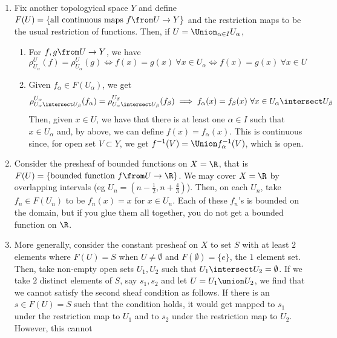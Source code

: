 \documentclass[11pt,leqno,oneside]{amsbook}
\renewcommand{\F}{F}
\numberwithin{thm}{section}
\begin{document}
\begin{example}
  \begin{enumerate}[label=(\arabic*)]
  \item Fix another topologyical space \(Y\) and define \(\F(U) =
    \{\text{all continuous maps }f \from U \to Y\}\) and the
    restriction maps to be the usual restriction of functions. Then,
    if \(U = \Union_{\alpha \in I} U_\alpha\),
    \begin{enumerate}
    \item For \(f,g \from U \to Y\), we have \[
        \rho^U_{U_\alpha}(f) = \rho^U_{U_\alpha}(g) \iff f(x) = g(x)\ 
        \forall x \in U_\alpha \iff f(x) = g(x)\ \forall x \in U
      \]
    \item Given \(f_\alpha \in \F(U_\alpha)\), we get \[
        \rho^{U_\alpha}_{U_\alpha \intersect U_\beta}(f_\alpha) =
        \rho^{U_\beta}_{U_\alpha \intersect U_\beta}(f_\beta) \implies
        f_\alpha(x) = f_\beta(x) \ \forall x \in U_\alpha \intersect U_\beta
      \]
      Then, given \(x \in U\), we have that there is at least one
      \(\alpha \in I\) such that \(x \in U_\alpha\) and, by above, we
      can define \(f(x) = f_\alpha(x)\). This is continuous since, for
      open set \(V \subset Y\), we get \(f^{-1}(V) = \Union
      f_\alpha^{-1}(V)\), which is open. 
    \end{enumerate}
  \item Consider the presheaf of bounded functions on \(X=\R\), that
    is \(\F(U) = \{\text{bounded function }f \from U \to \R\}\). We
    may cover \(X = \R\) by overlapping intervals (eg \(U_n =
    (n-\frac{1}{2}, n+\frac{4}{3})\)). Then, on each \(U_n\), take
    \(f_n \in \F(U_n)\) to be \(f_n(x) = x\) for \(x \in U_n\). Each
    of these \(f_n\)'s is bounded on the domain, but if you glue them
    all together, you do not get a bounded function on \(\R\).
  \item More generally, consider the constant presheaf on \(X\) to set
    \(S\) with at least \(2\) elements where \(F(U) = S\) when \(U
    \neq \emptyset\) and 
    \(\F(\emptyset) = \{e\}\), the \(1\) element set. Then, take
    non-empty open sets \(U_1, U_2\) such that \(U_1 \intersect U_2 =
    \emptyset\). If we take \(2\) distinct elements of \(S\), say
    \(s_1,s_2\) and let \(U = U_1 \union U_2\), we find that we cannot
    satisfy the second sheaf condition as follows. If there
    is an \(s \in \F(U) = S\) such that the condition holds, it would
    get mapped to \(s_1\) under the restriction map to \(U_1\) and to
    \(s_2\) under the restriction map to \(U_2\). However, this cannot

\end{enumerate}
\end{example}
\end{document}
